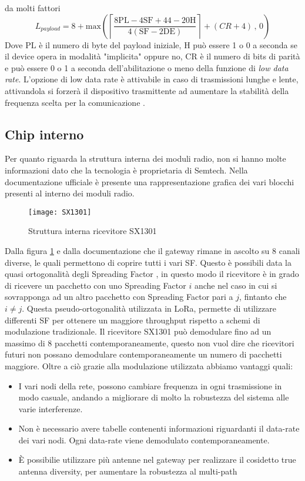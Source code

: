 da molti fattori 
\begin{equation}
        L_{payload} = 8+
        \text{max}\left(\left\lceil\frac{8\text{PL}-4\text{SF}+44-20\text{H}}{4(\text{SF}-2\text{DE})}
        \right\rceil+(CR+4)\, , \, 0 \right)
\end{equation}
Dove $\text{PL}$ è il numero di byte del payload iniziale, $\text{H}$ può essere
1 o 0 a seconda se il device opera in modalità "implicita" oppure no,
$\text{CR}$ è il numero di bits di parità e  può essere 0 o 1 a seconda
dell'abilitazione o meno della funzione di \emph{low data rate}.
L'opzione di low data rate è attivabile in caso di trasmissioni lunghe e lente,
attivandola si forzerà il dispositivo trasmittente ad aumentare la stabilità
della frequenza scelta per la comunicazione .

\subsection{Chip interno}
Per quanto riguarda la struttura interna dei moduli radio, non si hanno molte
informazioni dato che la tecnologia è proprietaria di Semtech. Nella
documentazione ufficiale è presente una rappresentazione grafica dei vari
blocchi presenti al interno dei moduli radio.

\begin{figure}[h]
\centering 
\texttt{[image: SX1301]}
\caption{Struttura interna ricevitore SX1301}
\label{fig:sx1301}
\end{figure}

Dalla figura \ref{fig:sx1301} e dalla documentazione 
che il gateway rimane in ascolto su 8 
canali diverse, le quali permettono di coprire tutti i vari SF. 
Questo è possibili data la quasi ortogonalità degli Spreading Factor
, in questo modo il ricevitore è in grado di ricevere un pacchetto
con uno Spreading Factor $i$ anche nel caso in cui si sovrapponga ad un altro
pacchetto con Spreading Factor pari a $j$, fintanto che $i\neq j$. Questa
pseudo-ortogonalità utilizzata in LoRa, permette di utilizzare differenti SF per
ottenere un maggiore throughput rispetto a schemi di modulazione tradizionale.
Il ricevitore  SX1301 può demodulare fino ad un massimo di 8 pacchetti
contemporaneamente, questo non vuol dire che ricevitori futuri non possano
demodulare contemporaneamente un numero di pacchetti maggiore.
Oltre a ciò grazie alla modulazione utilizzata abbiamo vantaggi quali:
\begin{itemize}
\item I vari nodi della rete, possono cambiare frequenza in ogni trasmissione in
modo casuale, andando a migliorare di molto la robustezza del sistema alle varie
interferenze.
\item Non è necessario avere tabelle contenenti informazioni riguardanti il
data-rate dei vari nodi. Ogni data-rate viene demodulato contemporaneamente.
\item È possibilie utilizzare più antenne nel gateway per realizzare il
cosidetto true antenna diversity, per aumentare la robustezza al multi-path
\end{itemize}

